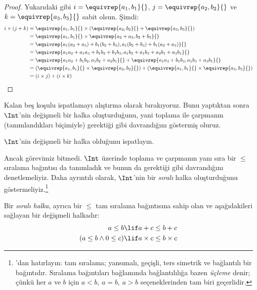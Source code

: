 \documentclass[../../../include/open-logic-section]{subfiles}
\begin{document}
\begin{proof}
Yukarıdaki gibi $i = \equivrep{a_1, b_1}{}$,
$j = \equivrep{a_2,b_2}{}$ ve $k = \equivrep{a_3, b_3}{}$ sabit olsun.
Şimdi:
\begin{align*}
	i \times (j + k)
	&= \equivrep{a_1, b_1}{} \times (\equivrep{a_2,b_2}{} + \equivrep{a_3, b_3}{})\\
	&= \equivrep{a_1, b_1}{} \times \equivrep{a_2 + a_3,b_2+b_3}{}\\
	&= \equivrep{a_1  (a_2 + a_3) + b_1  (b_2+b_3), a_1  (b_2 + b_3) + b_1 (a_2 + a_3)}{}\\
	&= \equivrep{a_1 a_2 + a_1a_3 + b_1 b_2+b_1b_3, a_1 b_2 + a_1b_3 + a_2b_1 + a_3b_1}{}\\		
	&= \equivrep{a_1a_2 + b_1b_2, a_1b_2 + a_2b_1}{} + \equivrep{a_1a_3 + b_1b_3, a_1b_3 + a_3b_1}{}\\
	&= (\equivrep{a_1, b_1}{} \times \equivrep{a_2,b_2}{}) + (\equivrep{a_1, b_1}{} \times  \equivrep{a_3, b_3}{})\\
	&= (i \times j) + (i \times k)
\end{align*}
\end{proof}

Kalan beş koşulu ispatlamayı alıştırma olarak bırakıyoruz. Bunu yaptıktan
sonra $\Int$'nin değişmeli bir halka oluşturduğunu, yani toplama ile
çarpmanın (tanımlandıkları biçimiyle) gerektiği gibi davrandığını göstermiş
oluruz.

\begin{prob}
$\Int$'nin değişmeli bir halka olduğunu ispatlayın.
\end{prob}

Ancak görevimiz bitmedi. $\Int$ üzerinde toplama ve çarpmanın yanı sıra bir
$\leq$ sıralama bağıntısı da tanımladık ve bunun da gerektiği gibi davrandığını
denetlemeliyiz. Daha ayrıntılı olarak, $\Int$'nin bir \emph{sıralı} halka
oluşturduğunu göstermeliyiz.\footnote{'dan
hatırlayın: tam sıralama; yansımalı, geçişli, ters simetrik ve bağlantılı bir
bağıntıdır. Sıralama bağıntıları bağlamında bağlantılılığa bazen
\emph{üçleme} denir; çünkü her $a$ ve $b$ için
$a < b,\ a = b,\ a > b$ seçeneklerinden tam biri geçerlidir.}

\begin{defn}
Bir \emph{sıralı halka}, ayrıca bir $\leq$ tam sıralama bağıntısına sahip olan
ve aşağıdakileri sağlayan bir değişmeli halkadır:
\begin{align*}
	a \leq b &\lif a + c \leq b + c\\
	(a \leq b \land 0 \leq c) &\lif a \times c \leq b \times c
\end{align*}
\end{defn}
\end{document}
